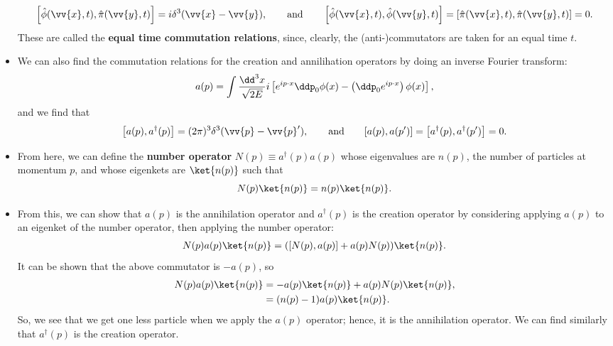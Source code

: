 \begin{itemize}
        \begin{equation}
            \left[\hat{\phi}(\vv{x},t),\hat{\pi}(\vv{y},t)\right] = i\delta^3(\vv{x} - \vv{y}), \qquad \text{and} \qquad \left[\hat{\phi}(\vv{x},t),\hat{\phi}(\vv{y},t)\right] = \left[\hat{\pi}(\vv{x},t),\hat{\pi}(\vv{y},t)\right] = 0.\label{QFTCommRelations1}
        \end{equation}
        These are called the \textbf{equal time commutation relations}, since, clearly, the (anti-)commutators are taken for an equal time $t$.
    \item We can also find the commutation relations for the creation and annilihation operators by doing an inverse Fourier transform:
        \begin{equation}
            a(p) = \int \frac{\dd^3x}{\sqrt{2E}} i \left[e^{ip\cdot x} \ddp_0\phi(x) - \left(\ddp_0 e^{ip\cdot x}\right)\phi(x)\right],\label{QFTCreationAnnihilation}
        \end{equation}
        and we find that
        \begin{equation}
            \left[a(p),a^{\dagger}(p)\right] = (2\pi)^3 \delta^3(\vv{p}-\vv{p}'), \qquad \text{and} \qquad [a(p),a(p')] = \left[a^{\dagger}(p),a^{\dagger}(p')\right]=0.\label{QFTCommRelations2}
        \end{equation}
    \item From here, we can define the \textbf{number operator} $N(p) \equiv a^{\dagger}(p)a(p)$ whose eigenvalues are $n(p)$, the number of particles at momentum $p$, and whose eigenkets are $\ket{n(p)}$ such that
        \begin{equation*}
            N(p)\ket{n(p)} = n(p)\ket{n(p)}.
        \end{equation*}
    \item From this, we can show that $a(p)$ is the annihilation operator and $a^{\dagger}(p)$ is the creation operator by considering applying $a(p)$ to an eigenket of the number operator, then applying the number operator:
        \begin{gather*}
            N(p)a(p)\ket{n(p)} = ([N(p),a(p)] + a(p)N(p))\ket{n(p)}.
        \end{gather*}
        It can be shown that the above commutator is $-a(p)$, so
        \begin{align*}
            N(p)a(p)\ket{n(p)} &= -a(p)\ket{n(p)} + a(p)N(p)\ket{n(p)}, \\
            &= (n(p)-1)a(p)\ket{n(p)}.
        \end{align*}
        So, we see that we get one less particle when we apply the $a(p)$ operator; hence, it is the annihilation operator. We can find similarly that $a^{\dagger}(p)$ is the creation operator.

\end{itemize}
